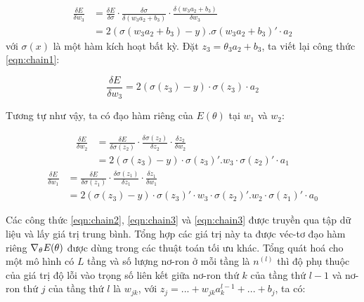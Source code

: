 \begin{equation}
	\label{eqn:chain1}
	\begin{split}
		\frac{\delta E}{\delta w_3} &= \frac{\delta E}{\delta \sigma}\cdot\frac{\delta \sigma}{\delta (w_3a_2 + b_3)}\cdot \frac{\delta(w_3a_2 + b_3)}{\delta w_3} \\ &= 2(\sigma(w_3a_2+b_3)-y). \sigma(w_3a_2 + b_3)'\cdot a_2
	\end{split}
\end{equation}
với $\sigma(x)$ là một hàm kích hoạt bất kỳ. Đặt $z_3 = \theta_3a_2 + b_3$, ta viết lại công thức \ref{eqn:chain1}:

\begin{equation}
	\label{eqn:chain2}
	\frac{\delta E}{\delta w_3} = 2(\sigma(z_3)-y)\cdot \sigma(z_3)\cdot a_2
\end{equation}

Tương tự như vậy, ta có đạo hàm riêng của $E(\theta)$ tại $w_1$ và $w_2$:

\begin{equation}
	\label{eqn:chain3}
	\begin{split}
		\frac{\delta E}{\delta w_2} &= \frac{\delta E}{\delta \sigma(z_2)}\cdot\frac{\delta \sigma(z_2)}{\delta z_2}\cdot\frac{\delta z_2}{\delta w_2} \\
		&= 2(\sigma(z_3)-y)\cdot \sigma(z_3)'.w_3\cdot\sigma(z_2)'\cdot a_1
	\end{split}
\end{equation}
\begin{equation}
	\label{eqn:chain4}
	\begin{split}
		\frac{\delta E}{\delta w_1} &= \frac{\delta E}{\delta \sigma(z_1)}\cdot\frac{\delta \sigma(z_1)}{\delta z_1}\cdot\frac{\delta z_1}{\delta w_1} \\
		&= 2(\sigma(z_3)-y)\cdot \sigma(z_3)'\cdot w_3\cdot\sigma(z_2)'.w_2\cdot\sigma(z_1)'\cdot a_0
	\end{split}
\end{equation}

Các công thức \ref{eqn:chain2}, \ref{eqn:chain3} và \ref{eqn:chain3} được truyền qua tập dữ liệu và lấy giá trị trung bình. Tổng hợp các giá trị này ta được véc-tơ đạo hàm riêng $\nabla_\theta \mathbf{\it{E}(\theta)}$ được dùng trong các thuật toán tối ưu khác. Tổng quát hoá cho một mô hình có $L$ tầng và số lượng nơ-ron ở mỗi tầng là $n^{(l)}$ thì độ phụ thuộc của giá trị độ lỗi vào trọng số liên kết giữa nơ-ron thứ $k$ của tầng thứ $l-1$ và nơ-ron thứ $j$ của tầng thứ $l$ là $w_{jk}$, với $z_j = ...+w_{jk}a^{l-1}_k+... + b_j$, ta có:

